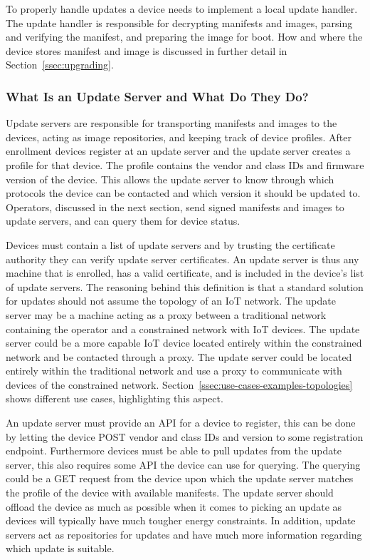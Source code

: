 \documentclass[0-thesis.tex]{subfiles}
\begin{document}
To properly handle updates a device needs to implement a local update handler. The update
handler is responsible for decrypting manifests and images, parsing and verifying the
manifest, and preparing the image for boot. How and where the device stores manifest and
image is discussed in further detail in Section~\ref{ssec:upgrading}.

\subsubsection{What Is an Update Server and What Do They Do?}
\label{sssec:what-is-an-update-server}
Update servers are responsible for transporting manifests and images to the devices,
acting as image repositories, and keeping track of device profiles. After enrollment
devices register at an update server and the update server creates a profile for that
device. The profile contains the vendor and class IDs and firmware version of the device.
This allows the update server to know through which protocols the device can be contacted
and which version it should be updated to. Operators, discussed in the next section, send
signed manifests and images to update servers, and can query them for device status.

Devices must contain a list of update servers and by trusting the certificate authority
they can verify update server certificates. An update server is thus any machine that is
enrolled, has a valid certificate, and is included in the device's list of update servers.
The reasoning behind this definition is that a standard solution for updates should not
assume the topology of an IoT network. The update server may be a machine acting as a
proxy between a traditional network containing the operator and a constrained network with
IoT devices. The update server could be a more capable IoT device located entirely within
the constrained network and be contacted through a proxy. The update server could be
located entirely within the traditional network and use a proxy to communicate with
devices of the constrained network. Section~\ref{ssec:use-cases-examples-topologies} shows
different use cases, highlighting this aspect.

An update server must provide an API for a device to register, this can be done by letting
the device POST vendor and class IDs and version to some registration endpoint.
Furthermore devices must be able to pull updates from the update server, this also
requires some API the device can use for querying. The querying could be a GET request
from the device upon which the update server matches the profile of the device with
available manifests. The update server should offload the device as much as possible when
it comes to picking an update as devices will typically have much tougher energy
constraints. In addition, update servers act as repositories for updates and have much
more information regarding which update is suitable.
\end{document}
